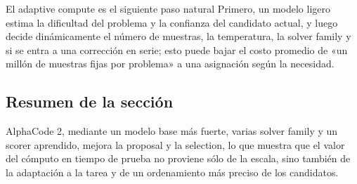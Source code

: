 \begin{knowledgebox}{El adaptive compute es el siguiente paso natural}
Primero, un modelo ligero estima la dificultad del problema y la confianza del candidato actual, y luego decide dinámicamente el número de muestras, la temperatura, la solver family y si se entra a una corrección en serie; esto puede bajar el costo promedio de «un millón de muestras fijas por problema» a una asignación según la necesidad.
\end{knowledgebox}

\subsection{Resumen de la sección}

AlphaCode 2, mediante un modelo base más fuerte, varias solver family y un scorer aprendido, mejora la proposal y la selection, lo que muestra que el valor del cómputo en tiempo de prueba no proviene sólo de la escala, sino también de la adaptación a la tarea y de un ordenamiento más preciso de los candidatos.
